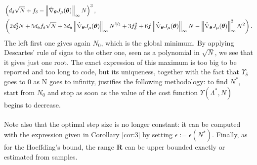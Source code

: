 \begin{align*}
&\left(d_{\delta}\sqrt{N}+f_{\delta} - \norm[\infty]{\gradApp{\vtheta}}N\right)^3, \\
&\left(2d_{\delta}^2N+5d_{\delta}f_{\delta}\sqrt{N}+3d_{\delta}\norm[\infty]{\gradApp{\vtheta}}N^{\nicefrac{3}{2}} +3f_{\delta}^2+6f\norm[\infty]{\gradApp{\vtheta}}N-\norm[\infty]{\gradApp{\vtheta}}^2N^2\right).
\end{align*}
The left first one gives again $N_0$, which is the global minimum. By applying Descartes' rule of signs to the other one, seen as a polynomial in $\sqrt{N}$, we see that it gives just one root. The exact expression of this maximum is too big to be reported and too long to code, but its uniqueness, together with the fact that $\Upsilon_{\delta}$ goes to $0$ as N goes to infinity, justifies the following methodology: to find $N^*$, start from $N_0$ and stop as soon as the value of the cost function $\Upsilon(\Lambda^*,N)$ begins to decrease.
\paragraph{}
Note also that the optimal step size is no longer constant: it can be computed with the expression given in Corollary \ref{cor:3} by setting $\epsilon := \epsilon(N^*)$.
Finally, as for the Hoeffding's bound, the range $\mathbf{R}$ can be upper bounded exactly or estimated from samples.

